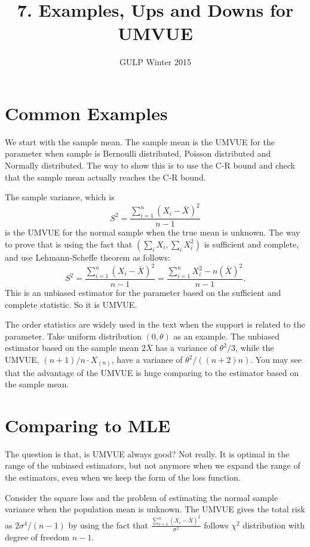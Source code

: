 \documentclass[12pt]{article}
\newcommand{\1}{\mathbbm{1}}
\begin{document}
\title{7. Examples, Ups and Downs for UMVUE}%
\author{GULP Winter 2015} %
\maketitle

\section{Common Examples}

We start with the sample mean. The sample mean is the UMVUE for the parameter when sample is Bernoulli distributed, Poisson distributed and Normally distributed. The way to show this is to use the C-R bound and check that the sample mean actually reaches the C-R bound. 

The sample variance, which is 
$$
S^2 = \frac{\sum_{i=1}^n(X_i -\bar{X})^2 }{n-1}
$$
is the UMVUE for the normal sample when the true mean is unknown. The way to prove that is using the fact that $(\sum_i X_i , \sum_i X_i^2)$ is sufficient and complete, and use Lehmann-Scheffe theorem as follows:
$$
S^2 = \frac{\sum_{i=1}^n(X_i -\bar{X})^2 }{n-1} = \frac{\sum_{i=1}^n X_i^2 -n(\bar{X})^2 }{n-1}.
$$
This is an unbiased estimator for the parameter based on the sufficient and complete statistic. So it is UMVUE.

The order statistics are widely used in the text when the support is related to the parameter. Take uniform distribution $(0,\theta)$ as an example. The unbiased estimator based on the sample mean $2\bar{X}$ has a variance of $\theta^2/3 $, while the UMVUE, $(n+1)/n\cdot X_{(n)}$, have a variance of $\theta^2/((n+2)n)$. You may see that the advantage of the UMVUE is huge comparing to the estimator based on the sample mean.

\section{Comparing to MLE}

The question is that, is UMVUE always good? Not really. It is optimal in the range of the unbiased estimators, but not anymore when we expand the range of the estimators, even when we keep the form of the loss function.

Consider the square loss and the problem of estimating the normal sample variance when the population mean is unknown. The UMVUE gives the total risk as $2\sigma^4/(n-1)$ by using the fact that $\frac{\sum_{i=1}^n(X_i -\bar{X})^2 }{\sigma^2}$ follows $\chi^2$ distribution with degree of freedom $n-1$. 
\end{document}
